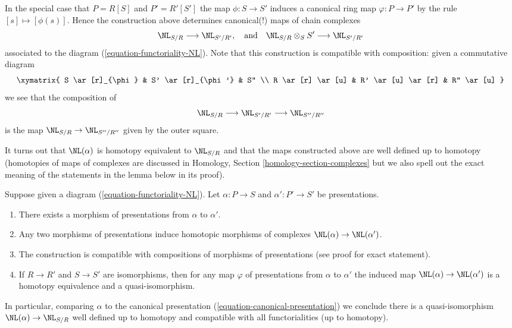 \medskip\noindent
In the special case that $P = R[S]$ and $P' = R'[S']$ the map
$\phi : S \to S'$ induces a canonical ring map
$\varphi : P \to P'$ by the rule $[s] \mapsto [\phi(s)]$.
Hence the construction above determines canonical(!) maps
of chain complexes
$$
\NL_{S/R} \longrightarrow \NL_{S'/R'},\quad\text{and}\quad
\NL_{S/R} \otimes_S S' \longrightarrow \NL_{S'/R'}
$$
associated to the diagram (\ref{equation-functoriality-NL}). Note that
this construction is compatible with composition: given a commutative
diagram
$$
\xymatrix{
S \ar[r]_{\phi} & S' \ar[r]_{\phi'} & S'' \\
R \ar[r] \ar[u] & R' \ar[u] \ar[r] & R'' \ar[u]
}
$$
we see that the composition of
$$
\NL_{S/R} \longrightarrow \NL_{S'/R'} \longrightarrow \NL_{S''/R''}
$$
is the map $\NL_{S/R} \to \NL_{S''/R''}$ given by the outer square.

\medskip\noindent
It turns out that $\NL(\alpha)$ is homotopy equivalent to $\NL_{S/R}$
and that the maps constructed above are well defined up to homotopy
(homotopies of maps of complexes are discussed in
Homology, Section \ref{homology-section-complexes}
but we also spell out the exact meaning of the statements in the lemma
below in its proof).

\begin{lemma}
\label{lemma-NL-homotopy}
Suppose given a diagram (\ref{equation-functoriality-NL}).
Let $\alpha : P \to S$ and $\alpha' : P' \to S'$ be presentations.
\begin{enumerate}
\item There exists a morphism of presentations from $\alpha$ to $\alpha'$.
\item Any two morphisms of presentations induce homotopic
morphisms of complexes $\NL(\alpha) \to \NL(\alpha')$.
\item The construction is compatible with compositions of morphisms
of presentations (see proof for exact statement).
\item If $R \to R'$ and $S \to S'$ are isomorphisms, then
for any map $\varphi$ of presentations from $\alpha$ to $\alpha'$
the induced map $\NL(\alpha) \to \NL(\alpha')$ is a homotopy equivalence
and a quasi-isomorphism.
\end{enumerate}
In particular, comparing $\alpha$ to the canonical presentation
(\ref{equation-canonical-presentation}) we conclude there is a
quasi-isomorphism $\NL(\alpha) \to \NL_{S/R}$ well defined
up to homotopy and compatible with all functorialities (up to homotopy).
\end{lemma}

